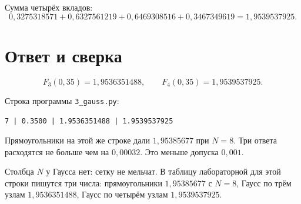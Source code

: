 \documentclass[11pt,a4paper]{article}
\begin{document}
Сумма четырёх вкладов:
\[
0{,}3275318571 + 0{,}6327561219 + 0{,}6469308516 + 0{,}3467349619 = 1{,}9539537925.
\]

\section*{Ответ и сверка}

\[
F_{3}(0{,}35) = 1{,}9536351488,
\qquad
F_{4}(0{,}35) = 1{,}9539537925.
\]

Строка программы \texttt{3\_gauss.py}:
\begin{center}
\texttt{7 | 0.3500 | 1.9536351488 | 1.9539537925}
\end{center}

Прямоугольники на этой же строке дали \(1{,}95385677\) при \(N = 8\).
Три ответа расходятся не больше чем на \(0{,}00032\).
Это меньше допуска \(0{,}001\).

Столбца \(N\) у Гаусса нет: сетку не мельчат.
В таблицу лабораторной для этой строки пишутся три числа:
прямоугольники \(1{,}95385677\) с \(N = 8\),
Гаусс по трём узлам \(1{,}9536351488\),
Гаусс по четырём узлам \(1{,}9539537925\).
\end{document}
